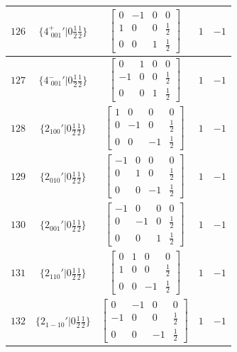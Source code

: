 \documentclass[fleqn,8pt]{jsarticle}
\begin{document}
\begin{longtable}{ccccc}
$ 126 $ & $ \{4^{+}_{\,\,001}{}'|0 \frac{1}{2} \frac{1}{2}\} $ & $ \begin{bmatrix} 0 & -1 & 0 & 0 \\ 1 & 0 & 0 & \frac{1}{2} \\ 0 & 0 & 1 & \frac{1}{2} \end{bmatrix} $ & $ 1 $ & $ -1 $ \\ \hline
$ 127 $ & $ \{4^{-}_{\,\,001}{}'|0 \frac{1}{2} \frac{1}{2}\} $ & $ \begin{bmatrix} 0 & 1 & 0 & 0 \\ -1 & 0 & 0 & \frac{1}{2} \\ 0 & 0 & 1 & \frac{1}{2} \end{bmatrix} $ & $ 1 $ & $ -1 $ \\ \hline
$ 128 $ & $ \{2{}_{100}{}'|0 \frac{1}{2} \frac{1}{2}\} $ & $ \begin{bmatrix} 1 & 0 & 0 & 0 \\ 0 & -1 & 0 & \frac{1}{2} \\ 0 & 0 & -1 & \frac{1}{2} \end{bmatrix} $ & $ 1 $ & $ -1 $ \\ \hline
$ 129 $ & $ \{2{}_{010}{}'|0 \frac{1}{2} \frac{1}{2}\} $ & $ \begin{bmatrix} -1 & 0 & 0 & 0 \\ 0 & 1 & 0 & \frac{1}{2} \\ 0 & 0 & -1 & \frac{1}{2} \end{bmatrix} $ & $ 1 $ & $ -1 $ \\ \hline
$ 130 $ & $ \{2{}_{001}{}'|0 \frac{1}{2} \frac{1}{2}\} $ & $ \begin{bmatrix} -1 & 0 & 0 & 0 \\ 0 & -1 & 0 & \frac{1}{2} \\ 0 & 0 & 1 & \frac{1}{2} \end{bmatrix} $ & $ 1 $ & $ -1 $ \\ \hline
$ 131 $ & $ \{2{}_{110}{}'|0 \frac{1}{2} \frac{1}{2}\} $ & $ \begin{bmatrix} 0 & 1 & 0 & 0 \\ 1 & 0 & 0 & \frac{1}{2} \\ 0 & 0 & -1 & \frac{1}{2} \end{bmatrix} $ & $ 1 $ & $ -1 $ \\ \hline
$ 132 $ & $ \{2{}_{1-10}{}'|0 \frac{1}{2} \frac{1}{2}\} $ & $ \begin{bmatrix} 0 & -1 & 0 & 0 \\ -1 & 0 & 0 & \frac{1}{2} \\ 0 & 0 & -1 & \frac{1}{2} \end{bmatrix} $ & $ 1 $ & $ -1 $ \\ \hline

\end{longtable}
\end{document}
